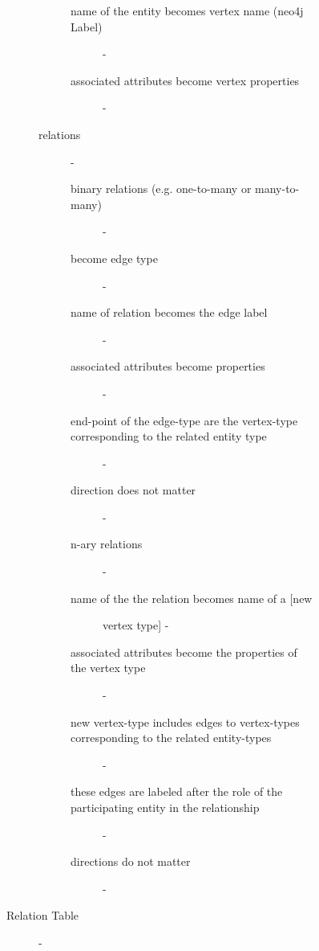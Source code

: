 \begin{description}
\begin{description}
\begin{description}
\begin{description}
\begin{description}
\begin{description}
            \item[name of the entity becomes vertex name (neo4j Label)] - 
            \item[associated attributes become vertex properties] - 
          \end{description} %
          \item[relations] - 
          \begin{description}
            \item[binary relations (e.g. one-to-many or many-to-many)] - 
              \item[become edge type] - 
              \item[name of relation becomes the edge label] - 
              \item[associated attributes become properties] - 
              \item[end-point of the edge-type are the vertex-type corresponding to the related entity type] - 
              \item[direction does not matter] - 
            \item[n-ary relations] - 
              \item[name of the the relation becomes name of a [new] vertex type] - 
              \item[associated attributes become the properties of the vertex type] - 
              \item[new vertex-type includes edges to vertex-types corresponding to the related entity-types] - 
              \item[these edges are labeled after the role of the participating entity in the relationship] - 
              \item[directions do not matter] - 
          \end{description} %
        \end{description} %
        \item[Relation Table] - 
      \end{description} %

\end{description}
\end{description}
\end{description}
